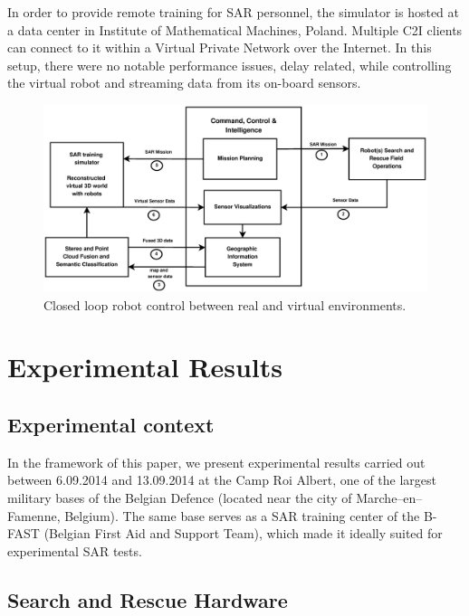 \documentclass{article}
\begin{document}
In order to provide remote training for SAR personnel, the simulator is hosted at a data center in Institute of Mathematical Machines, Poland. Multiple C2I clients can connect to it within a Virtual Private Network over the Internet.
In this setup, there were no notable performance issues, delay related, while controlling the virtual robot and streaming data from its on-board sensors.
\begin{figure} [h]
    \centering
    \includegraphics[width=\textwidth]{ROB-15-0035_fig13.eps}
    \caption{Closed loop robot control between real and virtual environments.}
    \label{fig:c2i_real_virtual_flow}
\end{figure}


\afterpage{\clearpage}

\section{Experimental Results}
\subsection{Experimental context}
In the framework of this paper, we present experimental results carried out between 6.09.2014 and 13.09.2014 at the Camp Roi Albert, one of the largest military bases of the Belgian Defence (located near the city of Marche--en--Famenne, Belgium). The same base serves as a SAR training center of the B-FAST (Belgian First Aid and Support Team), which made it ideally suited for experimental SAR tests.
\subsection{Search and Rescue Hardware}
\end{document}
